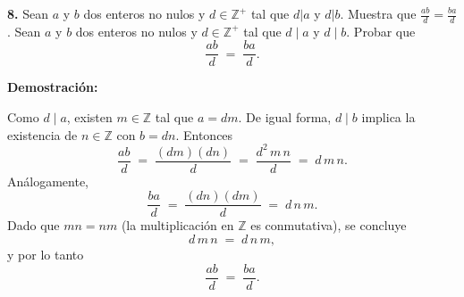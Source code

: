 \documentclass[12pt]{article}
\begin{document}
\vspace{1cm}

%
%
\textbf{8.} Sean $a$ y $b$ dos enteros no nulos y $d \in \mathbb{Z}^+$ tal que $d | a$ y $d | b$. Muestra que $\frac{ab}{d} = \frac{ba}{d}$.
Sean \(a\) y \(b\) dos enteros no nulos y \(d \in \mathbb{Z}^+\) tal que \(d \mid a\) y \(d \mid b\). Probar que
\[
\frac{ab}{d} \;=\; \frac{ba}{d}.
\]

\noindent
\textbf{Demostración:}

Como \(d \mid a\), existen \(m \in \mathbb{Z}\) tal que \(a = dm\). De igual forma, \(d \mid b\) implica la existencia de \(n \in \mathbb{Z}\) con \(b = dn\). Entonces
\[
\frac{ab}{d}
\;=\;
\frac{(dm)(dn)}{d}
\;=\;
\frac{d^2 \, m \, n}{d}
\;=\;
d \, m \, n.
\]
Análogamente,
\[
\frac{ba}{d}
\;=\;
\frac{(dn)(dm)}{d}
\;=\;
d \, n \, m.
\]
Dado que \(mn = nm\) (la multiplicación en \(\mathbb{Z}\) es conmutativa), se concluye 
\[
d \, m \, n 
\;=\; 
d \, n \, m,
\]
y por lo tanto
\[
\frac{ab}{d} 
\;=\; 
\frac{ba}{d}.
\]
\vspace{1cm}
\end{document}
